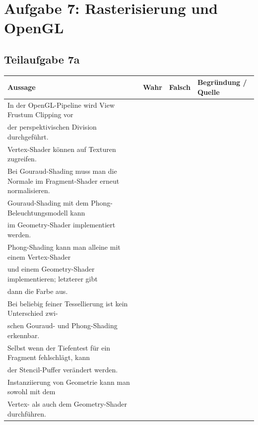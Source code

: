 \documentclass[a4paper]{scrartcl}
\begin{document}
\section*{Aufgabe 7: Rasterisierung und OpenGL}
\subsection*{Teilaufgabe 7a}
\begin{tabular}{p{8cm}llp{4cm}}\toprule
    Aussage & Wahr & Falsch & Begründung / Quelle \\\midrule
    In der OpenGL-Pipeline wird View Frustum Clipping vor\\der perspektivischen Division durchgeführt.                                    & ~    & ~      & ~                   \\
    Vertex-Shader können auf Texturen zugreifen.                                                                                          & ~    & ~      & ~                   \\
    Bei Gouraud-Shading muss man die Normale im Fragment-Shader erneut normalisieren.                                                     & ~    & ~      & ~                   \\
    Gouraud-Shading mit dem Phong-Beleuchtungsmodell kann\\im Geometry-Shader implementiert werden.                                       & ~    & ~      & ~                   \\
    Phong-Shading kann man alleine mit einem Vertex-Shader\\und einem Geometry-Shader implementieren; letzterer gibt\\dann die Farbe aus. & ~    & ~      & ~                   \\
    Bei beliebig feiner Tessellierung ist kein Unterschied zwi-\\schen Gouraud- und Phong-Shading erkennbar.                              & ~    & ~      & ~                   \\
    Selbst wenn der Tiefentest für ein Fragment fehlschlägt, kann\\der Stencil-Puffer verändert werden.                                   & ~    & ~      & ~                   \\
    Instanziierung von Geometrie kann man sowohl mit dem\\Vertex- als auch dem Geometry-Shader durchführen.                               & ~    & ~      & ~                   \\\bottomrule
\end{tabular}
\end{document}
